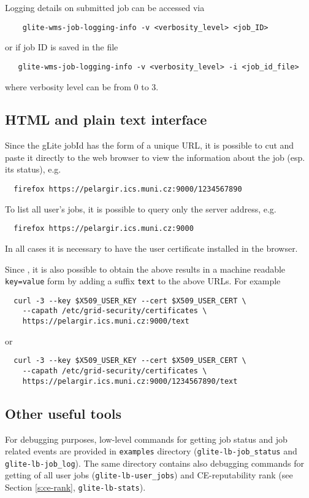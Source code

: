 Logging details on submitted job can be accessed via
\begin{verbatim}
    glite-wms-job-logging-info -v <verbosity_level> <job_ID>
\end{verbatim}
or if job ID is saved in the file
\begin{verbatim}
   glite-wms-job-logging-info -v <verbosity_level> -i <job_id_file>
\end{verbatim}
where verbosity level can be from 0 to 3. 







\subsection{HTML and plain text interface}
Since the gLite jobId has the form of a unique URL, it is possible to cut and paste it directly
to the web browser to view the information about the job (esp. its status), e.g.
\begin{verbatim}
  firefox https://pelargir.ics.muni.cz:9000/1234567890
\end{verbatim}
To list all user's jobs, it is possible to query only the \LB server address, e.g.
\begin{verbatim}
  firefox https://pelargir.ics.muni.cz:9000
\end{verbatim}
In all cases it is necessary to have the user certificate installed in the browser.


Since \LBnew, it is also possible to obtain the above results in a machine readable 
\verb'key=value' form by adding a suffix \verb'text' to the above URLs. For example
\begin{verbatim}
  curl -3 --key $X509_USER_KEY --cert $X509_USER_CERT \
    --capath /etc/grid-security/certificates \ 
    https://pelargir.ics.muni.cz:9000/text
\end{verbatim}
or
\begin{verbatim}
  curl -3 --key $X509_USER_KEY --cert $X509_USER_CERT \
    --capath /etc/grid-security/certificates \ 
    https://pelargir.ics.muni.cz:9000/1234567890/text
\end{verbatim}


\subsection{Other useful tools}

For debugging purposes, low-level commands for getting \LB job status and job related events are provided in 
\verb'examples' directory (\verb'glite-lb-job_status' and \verb'glite-lb-job_log'). The same directory
contains also debugging commands for getting of all user jobs (\verb'glite-lb-user_jobs') and
CE-reputability rank (see Section \ref{s:ce-rank}, \verb'glite-lb-stats').

